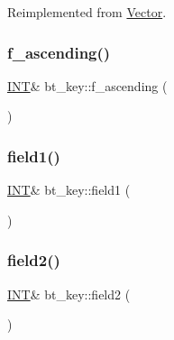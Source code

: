 Reimplemented from \mbox{\hyperlink{class_vector_af657307f3d344c8cef5d633335a5f484}{Vector}}.

\mbox{\label{classbt__key_af63f0ac36475ef1912a23b34cb0b1e9d}} 
\subsubsection{\texorpdfstring{f\+\_\+ascending()}{f\_ascending()}}
{\footnotesize\ttfamily \mbox{\hyperlink{galois_8h_a09fddde158a3a20bd2dcadb609de11dc}{I\+NT}}\& bt\+\_\+key\+::f\+\_\+ascending (\begin{DoxyParamCaption}{ }\end{DoxyParamCaption})\hspace{0.3cm}{\ttfamily [inline]}}

\mbox{\label{classbt__key_af372b25947e954e2a67f59418b9d1f9f}} 
\subsubsection{\texorpdfstring{field1()}{field1()}}
{\footnotesize\ttfamily \mbox{\hyperlink{galois_8h_a09fddde158a3a20bd2dcadb609de11dc}{I\+NT}}\& bt\+\_\+key\+::field1 (\begin{DoxyParamCaption}{ }\end{DoxyParamCaption})\hspace{0.3cm}{\ttfamily [inline]}}

\mbox{\label{classbt__key_a8aea2dcc348cbece3e97a29012dc7ffd}} 
\subsubsection{\texorpdfstring{field2()}{field2()}}
{\footnotesize\ttfamily \mbox{\hyperlink{galois_8h_a09fddde158a3a20bd2dcadb609de11dc}{I\+NT}}\& bt\+\_\+key\+::field2 (\begin{DoxyParamCaption}{ }\end{DoxyParamCaption})\hspace{0.3cm}{\ttfamily [inline]}}

